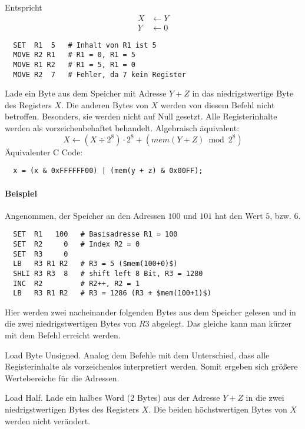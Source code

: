 Entspricht
\begin{align*}
  X & \gets Y \\
  Y & \gets 0
\end{align*}



\begin{lstlisting}
  SET  R1  5   # Inhalt von R1 ist 5
  MOVE R2 R1   # R1 = 0, R1 = 5
  MOVE R1 R2   # R1 = 5, R1 = 0
  MOVE R2  7   # Fehler, da 7 kein Register
\end{lstlisting}




Lade ein Byte aus dem Speicher mit Adresse $Y + Z$ in das niedrigstwertige
Byte des Registers $X$. Die anderen Bytes von $X$ werden von diesem Befehl nicht
betroffen. Besonders, sie werden nicht auf Null gesetzt.
Alle Registerinhalte werden als vorzeichenbehaftet behandelt.
Algebraisch äquivalent:
\[
    X \gets (X \div 2^{8}) \cdot 2^{8} + \left(mem(Y + Z) \bmod 2^{8} \right)
\]
Äquivalenter C Code:
\begin{lstlisting}
  x = (x & 0xFFFFFF00) | (mem(y + z) & 0x00FF);
\end{lstlisting}

\paragraph{Beispiel}
Angenommen, der Speicher an den Adressen $100$ und $101$ hat den Wert $5$,
bzw. $6$.
\begin{lstlisting}
  SET  R1   100   # Basisadresse R1 = 100
  SET  R2     0   # Index R2 = 0
  SET  R3     0
  LB   R3 R1 R2   # R3 = 5 ($mem(100+0)$)
  SHLI R3 R3  8   # shift left 8 Bit, R3 = 1280
  INC  R2         # R2++, R2 = 1
  LB   R3 R1 R2   # R3 = 1286 (R3 + $mem(100+1)$)
\end{lstlisting}
Hier werden zwei nacheinander folgenden Bytes aus dem Speicher gelesen und in
die zwei niedrigstwertigen Bytes von $R3$ abgelegt.
Das gleiche kann man kürzer mit dem Befehl  erreicht werden.




\glqq Load Byte Unsigned\grqq.
Analog dem Befehle  mit dem Unterschied, dass alle Registerinhalte als
vorzeichenlos interpretiert werden. Somit ergeben sich größere Wertebereiche für
die Adressen.


\glqq Load Half\grqq.
Lade ein halbes Word (2 Bytes) aus der Adresse $Y + Z$ in die zwei
niedrigstwertigen Bytes des Registers $X$.
Die beiden höchstwertigen Bytes von $X$ werden nicht verändert.

